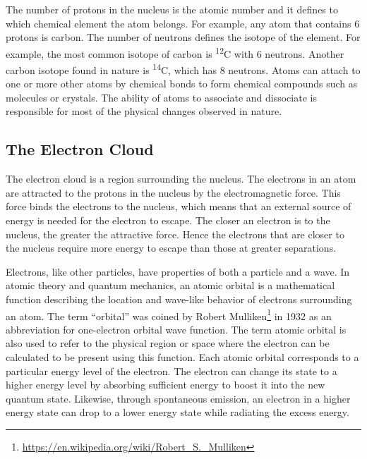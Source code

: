 \documentclass[
]{book}
\renewcommand{\href}[2]{#2\footnote{\url{#1}}}
\begin{document}
The number of protons in the nucleus is the atomic number and it defines to which chemical element the atom belongs. For example, any atom that contains 6 protons is carbon. The number of neutrons defines the isotope of the element. For example, the most common isotope of carbon is \textsuperscript{12}C with 6 neutrons. Another carbon isotope found in nature is \textsuperscript{14}C, which has 8 neutrons. Atoms can attach to one or more other atoms by chemical bonds to form chemical compounds such as molecules or crystals. The ability of atoms to associate and dissociate is responsible for most of the physical changes observed in nature.

\hypertarget{the-electron-cloud}{%
\subsection{The Electron Cloud}\label{the-electron-cloud}}

The electron cloud is a region surrounding the nucleus. The electrons in an atom are attracted to the protons in the nucleus by the electromagnetic force. This force binds the electrons to the nucleus, which means that an external source of energy is needed for the electron to escape. The closer an electron is to the nucleus, the greater the attractive force. Hence the electrons that are closer to the nucleus require more energy to escape than those at greater separations.

Electrons, like other particles, have properties of both a particle and a wave. In atomic theory and quantum mechanics, an atomic orbital is a mathematical function describing the location and wave-like behavior of electrons surrounding an atom. The term ``orbital'' was coined by \href{https://en.wikipedia.org/wiki/Robert_S._Mulliken}{Robert Mulliken} in 1932 as an abbreviation for one-electron orbital wave function. The term atomic orbital is also used to refer to the physical region or space where the electron can be calculated to be present using this function. Each atomic orbital corresponds to a particular energy level of the electron. The electron can change its state to a higher energy level by absorbing sufficient energy to boost it into the new quantum state. Likewise, through spontaneous emission, an electron in a higher energy state can drop to a lower energy state while radiating the excess energy.
\end{document}
